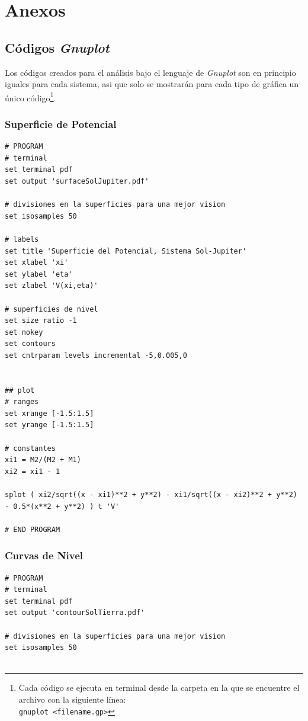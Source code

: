 \section{Anexos}
\label{sec:anexos}

\subsection{Códigos \textit{Gnuplot}}
Los códigos creados para el análisis bajo el lenguaje de \textit{Gnuplot} son en principio iguales para cada sistema, asi que solo se mostrarán para cada tipo de gráfica un único código\footnote{Cada código se ejecuta en terminal desde la carpeta en la que se encuentre el archivo con la siguiente línea: \\
\texttt{gnuplot <filename.gp>}}.

\begin{multicols}{2}
\subsubsection{Superficie de Potencial}
\begin{lstlisting}
# PROGRAM
# terminal
set terminal pdf
set output 'surfaceSolJupiter.pdf'

# divisiones en la superficies para una mejor vision
set isosamples 50

# labels
set title 'Superficie del Potencial, Sistema Sol-Jupiter'
set xlabel 'xi'
set ylabel 'eta'
set zlabel 'V(xi,eta)'

# superficies de nivel
set size ratio -1
set nokey
set contours
set cntrparam levels incremental -5,0.005,0


## plot
# ranges
set xrange [-1.5:1.5]
set yrange [-1.5:1.5]

# constantes
xi1 = M2/(M2 + M1)
xi2 = xi1 - 1

splot ( xi2/sqrt((x - xi1)**2 + y**2) - xi1/sqrt((x - xi2)**2 + y**2) - 0.5*(x**2 + y**2) ) t 'V'

# END PROGRAM
\end{lstlisting}	

\subsubsection{Curvas de Nivel}
\begin{lstlisting}
# PROGRAM
# terminal
set terminal pdf
set output 'contourSolTierra.pdf'

# divisiones en la superficies para una mejor vision
set isosamples 50


\end{lstlisting}
\end{multicols}
